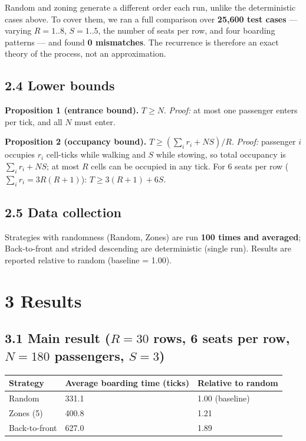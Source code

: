 \documentclass[
  11pt,
  a4paper]{article}
\newcounter{none} %
\begin{document}
Random and zoning generate a different order each run, unlike the
deterministic cases above. To cover them, we ran a full comparison over
\textbf{25,600 test cases} --- varying \(R=1..8\), \(S=1..5\), the
number of seats per row, and four boarding patterns --- and found
\textbf{0 mismatches}. The recurrence is therefore an exact theory of
the process, not an approximation.

\subsection{2.4 Lower bounds}\label{lower-bounds}

\textbf{Proposition 1 (entrance bound).} \(T\ge N\). \emph{Proof:} at
most one passenger enters per tick, and all \(N\) must enter.

\textbf{Proposition 2 (occupancy bound).}
\(T\ge\left(\sum_i r_i+N S\right)/R\). \emph{Proof:} passenger \(i\)
occupies \(r_i\) cell-ticks while walking and \(S\) while stowing, so
total occupancy is \(\sum_i r_i+N S\); at most \(R\) cells can be
occupied in any tick. For 6 seats per row (\(\sum_i r_i=3R(R+1)\)):
\(T\ge 3(R+1)+6S\).

\subsection{2.5 Data collection}\label{data-collection}

Strategies with randomness (Random, Zones) are run \textbf{100 times and
averaged}; Back-to-front and strided descending are deterministic
(single run). Results are reported relative to random (baseline = 1.00).

\section{3 Results}\label{results}

\subsection{\texorpdfstring{3.1 Main result (\(R=30\) rows, 6 seats per
row, \(N=180\) passengers,
\(S=3\))}{3.1 Main result (R=30 rows, 6 seats per row, N=180 passengers, S=3)}}\label{main-result-r30-rows-6-seats-per-row-n180-passengers-s3}

{\def\LTcaptype{none} %
\begin{longtable}[]{@{}lll@{}}
\toprule\noalign{}
Strategy & Average boarding time (ticks) & Relative to random \\
\midrule\noalign{}
\endhead
\bottomrule\noalign{}
\endlastfoot
Random & 331.1 & 1.00 (baseline) \\
Zones (5) & 400.8 & 1.21 \\
Back-to-front & 627.0 & 1.89 \\
\end{longtable}
}
\end{document}
